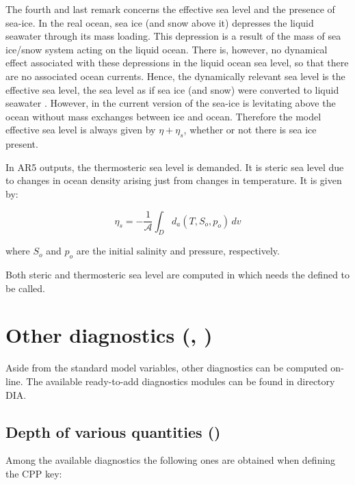 \documentclass[../main/NEMO_manual]{subfiles}
\begin{document}
The fourth and last remark concerns the effective sea level and the presence of sea-ice.
In the real ocean, sea ice (and snow above it)  depresses the liquid seawater through its mass loading.
This depression is a result of the mass of sea ice/snow system acting on the liquid ocean.
There is, however, no dynamical effect associated with these depressions in the liquid ocean sea level,
so that there are no associated ocean currents.
Hence, the dynamically relevant sea level is the effective sea level,
\ie the sea level as if sea ice (and snow) were converted to liquid seawater \citep{Campin_al_OM08}.
However, in the current version of \NEMO the sea-ice is levitating above the ocean without mass exchanges between
ice and ocean.
Therefore the model effective sea level is always given by $\eta + \eta_s$, whether or not there is sea ice present.

In AR5 outputs, the thermosteric sea level is demanded.
It is steric sea level due to changes in ocean density arising just from changes in temperature.
It is given by:

\[
  \eta_s = - \frac{1}{\mathcal{A}} \int_D d_a(T,S_o,p_o) \,dv
\]

where $S_o$ and $p_o$ are the initial salinity and pressure, respectively.

Both steric and thermosteric sea level are computed in  which needs the  defined to
be called.

\section{Other diagnostics (\protect{}, \protect{})}
\label{sec:DIA_diag_others}

Aside from the standard model variables, other diagnostics can be computed on-line.
The available ready-to-add diagnostics modules can be found in directory DIA.

\subsection{Depth of various quantities (\protect{})}

Among the available diagnostics the following ones are obtained when defining the  CPP key:
\end{document}
